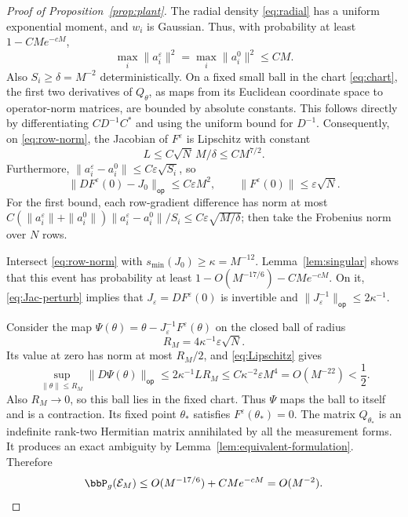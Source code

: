 \documentclass[11pt,reqno]{amsart}
\begin{document}
\begin{proof}[Proof of Proposition~\ref{prop:plant}]
The radial density \eqref{eq:radial} has a uniform exponential moment, and $w_i$ is Gaussian. Thus, with probability at least $1-CMe^{-cM}$,
\begin{equation}\label{eq:row-norm}
 \max_i\|a_i^\varepsilon\|^2=\max_i\|a_i^0\|^2\le CM.
\end{equation}
Also $S_i\ge\delta=M^{-2}$ deterministically. On a fixed small ball in the chart \eqref{eq:chart}, the first two derivatives of $Q_\theta$, as maps from its Euclidean coordinate space to operator-norm matrices, are bounded by absolute constants. This follows directly by differentiating $CD^{-1}C^*$ and using the uniform bound for $D^{-1}$.
Consequently, on \eqref{eq:row-norm}, the Jacobian of $F^\varepsilon$ is Lipschitz with constant
\begin{equation}\label{eq:Lipschitz}
 L\le C\sqrt N\,M/\delta\le CM^{7/2}.
\end{equation}
Furthermore, $\|a_i^\varepsilon-a_i^0\|\le C\varepsilon\sqrt{S_i}$, so
\begin{equation}\label{eq:Jac-perturb}
 \|DF^\varepsilon(0)-J_0\|_{\mathsf{op}}\le C\varepsilon M^2,
 \qquad \|F^\varepsilon(0)\|\le\varepsilon\sqrt N.
\end{equation}
For the first bound, each row-gradient difference has norm at most
$C(\|a_i^\varepsilon\|+\|a_i^0\|)\|a_i^\varepsilon-a_i^0\|/S_i
\le C\varepsilon\sqrt{M/\delta}$; then take the Frobenius norm over $N$ rows.

Intersect \eqref{eq:row-norm} with $s_{\min}(J_0)\ge\kappa=M^{-12}$. Lemma~\ref{lem:singular} shows that this event has probability at least $1-O(M^{-17/6})-CMe^{-cM}$. On it, \eqref{eq:Jac-perturb} implies that $J_\varepsilon=DF^\varepsilon(0)$ is invertible and $\|J_\varepsilon^{-1}\|_{\mathsf{op}}\le2\kappa^{-1}$.

Consider the map $\Psi(\theta)=\theta-J_\varepsilon^{-1}F^\varepsilon(\theta)$ on the closed ball of radius
\[
 R_M=4\kappa^{-1}\varepsilon\sqrt N.
\]
Its value at zero has norm at most $R_M/2$, and \eqref{eq:Lipschitz} gives
\[
 \sup_{\|\theta\|\le R_M}\|D\Psi(\theta)\|_{\mathsf{op}}
 \le2\kappa^{-1}LR_M
 \le C\kappa^{-2}\varepsilon M^4=O(M^{-22})<\frac12.
\]
Also $R_M\to0$, so this ball lies in the fixed chart. Thus $\Psi$ maps the ball to itself and is a contraction. Its fixed point $\theta_*$ satisfies $F^\varepsilon(\theta_*)=0$.
The matrix $Q_{\theta_*}$ is an indefinite rank-two Hermitian matrix annihilated by all the measurement forms. It produces an exact ambiguity by Lemma~\ref{lem:equivalent-formulation}. Therefore
\[
 \bbP_g(\mathcal E_M)\le O(M^{-17/6})+CMe^{-cM}=O(M^{-2}). \qedhere
\]
\end{proof}











\end{document}

